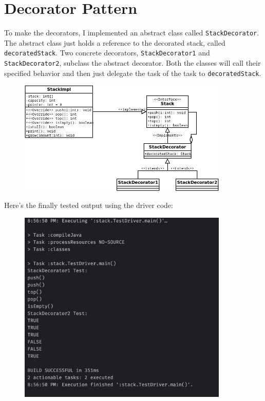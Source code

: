 \documentclass[english,12pt]{article}
\begin{document}
\section*{Decorator Pattern}
To make the decorators, I implemented an abstract class called \texttt{StackDecorator}.
The abstract class just holds a reference to the decorated stack, called \texttt{decoratedStack}.
Two concrete decorators, \texttt{StackDecorator1} and \texttt{StackDecorator2},
subclass the abstract decorator. Both the classes will call their specified behavior
and then just delegate the task of the task to \texttt{decoratedStack}.
\begin{figure}[H]
   \includegraphics[width=10cm]{diagrams/StackDecorator.png}
\end{figure}
Here's the finally tested output using the driver code:
\begin{figure}[H]
   \includegraphics[width=10cm]{images/output.png}
\end{figure}
\end{document}
